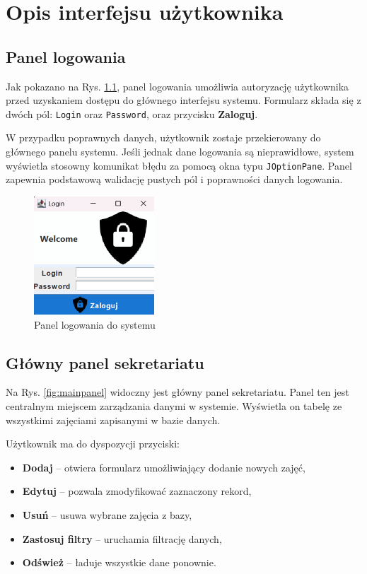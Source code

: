 \chapter{Opis interfejsu użytkownika}

\section*{Panel logowania}

Jak pokazano na Rys. \ref{fig:login_panel}, panel logowania umożliwia autoryzację użytkownika przed uzyskaniem dostępu do głównego interfejsu systemu. Formularz składa się z dwóch pól: \texttt{Login} oraz \texttt{Password}, oraz przycisku \textbf{Zaloguj}.

W przypadku poprawnych danych, użytkownik zostaje przekierowany do głównego panelu systemu. Jeśli jednak dane logowania są nieprawidłowe, system wyświetla stosowny komunikat błędu za pomocą okna typu \texttt{JOptionPane}. Panel zapewnia podstawową walidację pustych pól i poprawności danych logowania.

\begin{figure}[H]
\centering
\includegraphics[width=0.4\textwidth]{figures/workApl/login_panel.png}
\caption{Panel logowania do systemu}
\label{fig:login_panel}
\end{figure}

\clearpage

\section*{Główny panel sekretariatu}

Na Rys. \ref{fig:mainpanel} widoczny jest główny panel sekretariatu. Panel ten jest centralnym miejscem zarządzania danymi w systemie. Wyświetla on tabelę ze wszystkimi zajęciami zapisanymi w bazie danych.

Użytkownik ma do dyspozycji przyciski:
\begin{itemize}
    \item \textbf{Dodaj} – otwiera formularz umożliwiający dodanie nowych zajęć,
    \item \textbf{Edytuj} – pozwala zmodyfikować zaznaczony rekord,
    \item \textbf{Usuń} – usuwa wybrane zajęcia z bazy,
    \item \textbf{Zastosuj filtry} – uruchamia filtrację danych,
    \item \textbf{Odśwież} – ładuje wszystkie dane ponownie.
\end{itemize}

